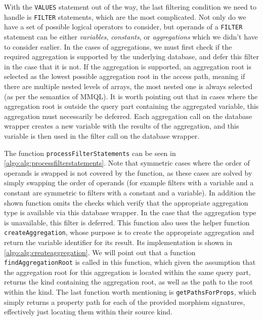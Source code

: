 With the \texttt{VALUES} statement out of the way, the last filtering condition we need to handle is \texttt{FILTER} statements, which are the most complicated.
Not only do we have a set of possible logical operators to consider, but operands of a \texttt{FILTER} statement can be either \textit{variables}, \textit{constants}, or \textit{aggregations} which we didn't have to consider earlier.
In the cases of aggregations, we must first check if the required aggregation is supported by the underlying database, and defer this filter in the case that it is not.
If the aggregation is supported, an aggregation root is selected as the lowest possible aggregation root in the access path, meaning if there are multiple nested levels of arrays, the most nested one is always selected (as per the semantics of MMQL).
It is worth pointing out that in cases where the aggregation root is outside the query part containing the aggregated variable, this aggregation must necessarily be deferred.
Each aggregation call on the database wrapper creates a new variable with the results of the aggregation, and this variable is then used in the filter call on the database wrapper.

The function \texttt{processFilterStatements} can be seen in \cref{algo:alg:processfilterstatements}.
Note that symmetric cases where the order of operands is swapped is not covered by the function, as these cases are solved by simply swapping the order of operands (for example filters with a variable and a constant are symmetric to filters with a constant and a variable).
In addition the shown function omits the checks which verify that the appropriate aggregation type is available via this database wrapper.
In the case that the aggregation type is unavailable, this filter is deferred.
This function also uses the helper function \texttt{createAggregation}, whose purpose is to create the appropriate aggregation and return the variable identifier for its result.
Its implementation is shown in \cref{algo:alg:createaggregation}.
We will point out that a function \texttt{findAggregationRoot} is called in this function, which given the assumption that the aggregation root for this aggregation is located within the same query part, returns the kind containing the aggregation root, as well as the path to the root within the kind.
The last function worth mentioning is \texttt{getPathsForProps}, which simply returns a property path for each of the provided morphism signatures, effectively just locating them within their source kind.

